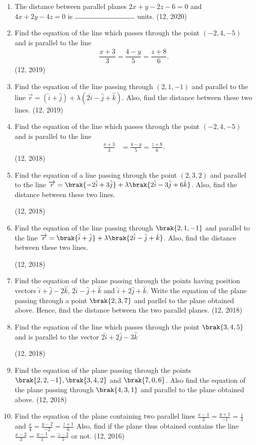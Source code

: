 \begin{enumerate}[label=\thesubsection.\arabic*, ref=\thesubsection.\theenumi]
\item The distance between parallel planes $2x + y - 2z - 6 = 0$ and $4x + 2y - 4z = 0$ is $\rule{3cm}{0.15mm}$ units.
\hfill (12, 2020)
	\item Find the equation of the line which passes through the point $(-2, 4, -5)$ and is parallel to the line
	\begin{align*}
	\dfrac{x+3}{3} = \dfrac{4-y}{5} = \dfrac{z+8}{6}.
	\end{align*} \hfill (12, 2019)
	\item Find the equation of the line passing through $(2, 1, -1)$ and parallel to the line $\overrightarrow{r} = (\hat{i} + \hat{j}) + \lambda (2\hat{i} - \hat{j} + \hat{k})$. Also, find the distance between these two lines. \hfill (12, 2019)
\item Find the equation of the line which passes through the point $(-2, 4, -5)$ and is parallel to the line 
\begin{align*}
\frac{x + 3}{3} &= \frac{4 - y}{5} = \frac{z + 8}{6}.
\end{align*}
\hfill (12, 2018)
\item Find the equation of a line passing through the point $(2,3,2)$ and parallel to the line $\overrightarrow{r} = \brak{-2\hat{i}+3\hat{j}}+\lambda\brak{2\hat{i}-3\hat{j}+6\hat{k}}$. Also, find the distance between these two lines.

\hfill (12, 2018) 
\item  Find the equation of the line passing through $\brak{2, 1, -1}$ and parallel to the line $\overrightarrow{r}=\brak{\hat{i}+\hat{j}}+\lambda\brak{2\hat{i}-\hat{j}+\hat{k}}$. Also, find the distance between these two lines.

\hfill (12, 2018) 
\item Find the equation of the plane passing through the points having position vectors $\hat{i} + \hat{ j} - 2\hat{k}$, $2\hat{i}-\hat{j} + \hat{k}$ and $\hat{i} + 2\hat{j} + \hat{k}$. Write the equation of the plane passing through a point $\brak{2,3,7}$ and parllel to the plane obtained above. Hence, find the distance between the two parallel planes.
\hfill (12, 2018) 
\item Find the equation of the line which passes through the point $\brak{3,4,5}$ and is parallel to the vector $2\hat{i}+2\hat{j}-3\hat{k}$

\hfill (12, 2018) 
\item Find the equation of the plane passing through the points $\brak{2,2,-1},\brak{3,4,2}$ and $\brak{7,0,6}$. Also find the equation of the plane passing through $\brak{4,3,1}$ and parallel to the plane obtained above.
\hfill (12, 2018) 
\item Find the equation of the plane containing two parallel lines
      $\frac{x-1}{2} = \frac{y+1}{-1} = \frac{z}{3}$ and $\frac{x}{4} = \frac{y-2}{-2} = \frac{z+1}{6}$
      Also, find if the plane thus obtained contains the line
      $\frac{x-2}{3} =\frac{y-1}{1} = \frac{z-2}{5}$ or not. \hfill (12, 2016)

\end{enumerate}
